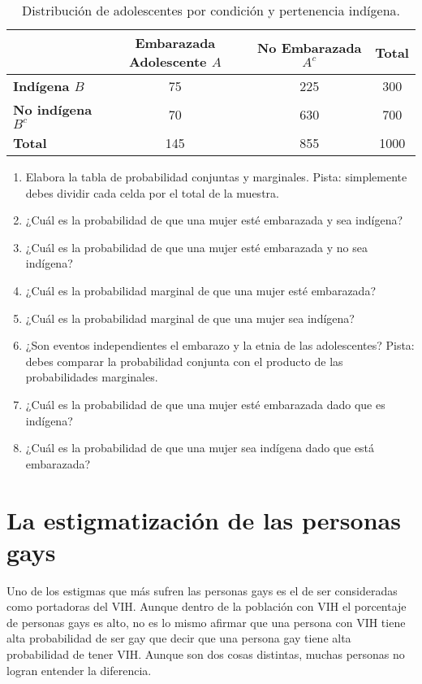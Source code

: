 \documentclass[a4paper]{article}
\begin{document}
\begin{table}[H]
	\centering
	\begin{tabular}{lccc} %
		\toprule
		& \textbf{Embarazada Adolescente $A$} & \textbf{No Embarazada $A^c$} & \textbf{Total} \\
		\midrule
		\textbf{Indígena $B$} & 75 & 225 & 300 \\
		\textbf{No indígena $B^c$} & 70 & 630 & 700 \\
		\midrule
		\textbf{Total} & 145 & 855 & 1000 \\
		\bottomrule
	\end{tabular}
	\caption{Distribución de adolescentes por condición y pertenencia indígena.}
	\label{tabla:distribucion}
\end{table}

\begin{enumerate}[label=\alph*.]
	\item Elabora la tabla de probabilidad conjuntas y marginales. Pista: simplemente debes dividir cada celda por el total de la muestra.
	\item ¿Cuál es la probabilidad de que una mujer esté embarazada y sea indígena?
	\item ¿Cuál es la probabilidad de que una mujer esté embarazada y no sea indígena?
	\item ¿Cuál es la probabilidad marginal de que una mujer esté embarazada?
	\item ¿Cuál es la probabilidad marginal de que una mujer sea indígena?
	\item ¿Son eventos independientes el embarazo y la etnia de las adolescentes? Pista: debes comparar la probabilidad conjunta con el producto de las probabilidades marginales.
	\item ¿Cuál es la probabilidad de que una mujer esté embarazada dado que es indígena?
	\item ¿Cuál es la probabilidad de que una mujer sea indígena dado que está embarazada?
\end{enumerate}

\section{La estigmatización de las personas gays}

Uno de los estigmas que más sufren las personas gays es el de ser consideradas como portadoras del VIH. Aunque dentro de la población con VIH el porcentaje de personas gays es alto, no es lo mismo afirmar que una persona con VIH tiene alta probabilidad de ser gay que decir que una persona gay tiene alta probabilidad de tener VIH. Aunque son dos cosas distintas, muchas personas no logran entender la diferencia.
\end{document}
